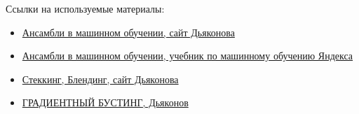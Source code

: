 Ссылки на используемые материалы:
\begin{itemize}
    \item \href{https://alexanderdyakonov.wordpress.com/2019/04/19/%D0%B0%D0%BD%D1%81%D0%B0%D0%BC%D0%B1%D0%BB%D0%B8-%D0%B2-%D0%BC%D0%B0%D1%88%D0%B8%D0%BD%D0%BD%D0%BE%D0%BC-%D0%BE%D0%B1%D1%83%D1%87%D0%B5%D0%BD%D0%B8%D0%B8}{Ансамбли в машинном обучении, сайт Дьяконова}
    \item \href{https://academy.yandex.ru/handbook/ml/article/ansambli-v-mashinnom-obuchenii}{Ансамбли в машинном обучении, учебник по машинному обучению Яндекса}
    \item \href{https://alexanderdyakonov.wordpress.com/2017/03/10/c%d1%82%d0%b5%d0%ba%d0%b8%d0%bd%d0%b3-stacking-%d0%b8-%d0%b1%d0%bb%d0%b5%d0%bd%d0%b4%d0%b8%d0%bd%d0%b3-blending/}{Стеккинг, Блендинг, сайт Дьяконова}
    \item \href{http://dyakonov.org/2017/06/09/%d0%b3%d1%80%d0%b0%d0%b4%d0%b8%d0%b5%d0%bd%d1%82%d0%bd%d1%8b%d0%b9-%d0%b1%d1%83%d1%81%d1%82%d0%b8%d0%bd%d0%b3/}{ГРАДИЕНТНЫЙ БУСТИНГ, Дьяконов}
\end{itemize}


